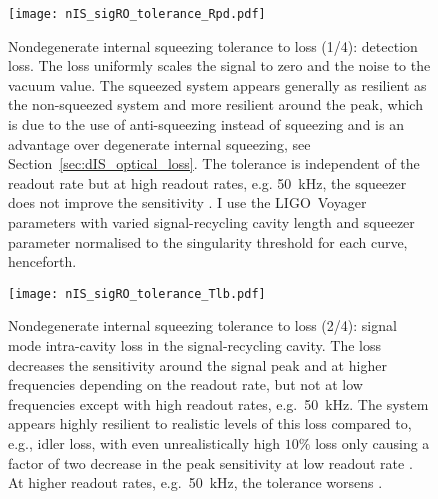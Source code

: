 \begin{figure}
    \centering
    \texttt{[image: nIS\_sigRO\_tolerance\_Rpd.pdf]}
    \caption{  Nondegenerate internal squeezing tolerance to loss (1/4): detection loss. The loss uniformly scales the signal to zero and the noise to the vacuum value. The squeezed system appears generally as resilient as the non-squeezed system and more resilient around the peak, which is due to the use of anti-squeezing instead of squeezing and is an advantage over degenerate internal squeezing, see Section~\ref{sec:dIS_optical_loss}. The tolerance is independent of the readout rate but at high readout rates, e.g. 50~kHz, the squeezer does not improve the sensitivity . I use the LIGO~Voyager parameters with varied signal-recycling cavity length  and squeezer parameter normalised to the singularity threshold for each curve, henceforth.}
    \label{fig:nIS_sigRO_tolerance_Rpd}
\end{figure}
\begin{figure}
    \centering
    \texttt{[image: nIS\_sigRO\_tolerance\_Tlb.pdf]}
    \caption{  Nondegenerate internal squeezing tolerance to loss (2/4): signal mode intra-cavity loss in the signal-recycling cavity. The loss decreases the sensitivity around the signal peak and at higher frequencies depending on the readout rate, but not at low frequencies except with high readout rates, e.g.\ 50~kHz. The system appears highly resilient to realistic levels of this loss compared to, e.g., idler loss, with even unrealistically high $10\%$ loss only causing a factor of two decrease in the peak sensitivity at low readout rate . At higher readout rates, e.g.\ 50~kHz, the tolerance worsens .
    }
    \label{fig:nIS_sigRO_tolerance_Tlb}
\end{figure}
